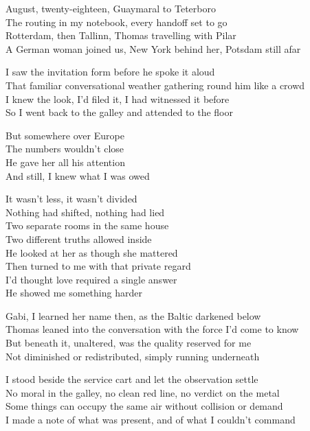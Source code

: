 \begin{lyrics}
August, twenty-eighteen, Guaymaral to Teterboro\\
The routing in my notebook, every handoff set to go\\
Rotterdam, then Tallinn, Thomas travelling with Pilar\\
A German woman joined us, New York behind her, Potsdam still afar

I saw the invitation form before he spoke it aloud\\
That familiar conversational weather gathering round him like a crowd\\
I knew the look, I’d filed it, I had witnessed it before\\
So I went back to the galley and attended to the floor

But somewhere over Europe\\
The numbers wouldn’t close\\
He gave her all his attention\\
And still, I knew what I was owed

It wasn’t less, it wasn’t divided\\
Nothing had shifted, nothing had lied\\
Two separate rooms in the same house\\
Two different truths allowed inside\\
He looked at her as though she mattered\\
Then turned to me with that private regard\\
I’d thought love required a single answer\\
He showed me something harder

Gabi, I learned her name then, as the Baltic darkened below\\
Thomas leaned into the conversation with the force I’d come to know\\
But beneath it, unaltered, was the quality reserved for me\\
Not diminished or redistributed, simply running underneath

I stood beside the service cart and let the observation settle\\
No moral in the galley, no clean red line, no verdict on the metal\\
Some things can occupy the same air without collision or demand\\
I made a note of what was present, and of what I couldn’t command


\end{lyrics}
